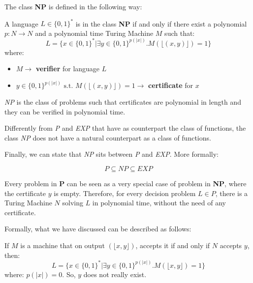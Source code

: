 The class \textbf{NP} is defined in the following way:
\begin{definition}
    A language $L \in \{0,1\}^*$ is in the class \textbf{NP} if and only if there exist a polynomial $p: N \rightarrow N$ and a polynomial time Turing Machine 
    $M$ such that:
    $$ L = \{x \in \{0,1\}^* | \exists y \in \{0,1\}^{p(|x|)}.M(\lfloor (x, y) \rfloor) = 1\} $$
    where:
    \begin{itemize}
        \renewcommand{\labelitemi}{-}
        \item $M \rightarrow$ \textbf{verifier} for language $L$
        \item $y \in \{0, 1\}^{p(|x|)} \text{ s.t. } M(\lfloor (x, y) \rfloor) = 1 \rightarrow$ \textbf{certificate} for $x$
    \end{itemize}
\end{definition}
\textit{NP} is the class of problems such that certificates are polynomial in length and they can be verified in polynomial time. \vspace{7pt}

Differently from \textit{P} and \textit{EXP} that have as counterpart the class of functions, the class \textit{NP} does not have a natural counterpart as 
a class of functions. 

Finally, we can state that \textit{NP} sits between \textit{P} and \textit{EXP}. More formally:
\begin{definition}[title = Theorem]
    $$ P \subseteq \textit{NP} \subseteq \textit{EXP} $$
\end{definition}
Every problem in \textbf{P} can be seen as a very special case of problem in \textbf{NP}, where the certificate $y$ is empty. Therefore, for every decision problem 
$L \in P$, there is a Turing Machine $N$ solving $L$ in polynomial time, without the need of any certificate. \vspace{7pt}

Formally, what we have discussed can be described as follows:
\begin{definition}
    If $M$ is a machine that on output $(\lfloor x, y \rfloor)$, accepts it if and only if $N$ accepts $y$, then:
    $$L = \{x \in \{0,1\}^*| \exists y \in \{0,1\}^{p(|x|)}.M(\lfloor x,y \rfloor) = 1 \}$$
    where:
    $p(|x|) = 0$. So, $y$ does not really exist.
\end{definition}